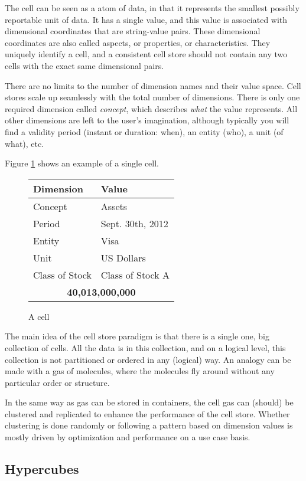 \documentclass{vldb}
\begin{document}
The cell can be seen as a atom of data, in that it represents the smallest possibly reportable unit of data. It has a single value, and this value is associated with dimensional coordinates that are string-value pairs. These dimensional coordinates are also called aspects, or properties, or characteristics. They uniquely identify a cell, and a consistent cell store should not contain any two cells with the exact same dimensional pairs.

There are no limits to the number of dimension names and their value space. Cell stores scale up seamlessly with the total number of dimensions. There is only one required dimension called \emph{concept}, which describes \emph{what} the value represents. All other dimensions are left to the user's imagination, although typically you will find a validity period (instant or duration: when), an entity (who), a unit (of what), etc.

Figure \ref{fig-cell} shows an example of a single cell.

\begin{figure}
\caption{A cell}
\label{fig-cell}
\begin{tabular}{|l|l|}
\hline
Dimension & Value \\
\hline
Concept & Assets \\
Period & Sept. 30th, 2012 \\
Entity & Visa \\
Unit & US Dollars \\
Class of Stock & Class of Stock A \\
\hline
\multicolumn{2}{|c|}{\textbf{40,013,000,000}} \\
\hline
\end{tabular}
\end{figure}

The main idea of the cell store paradigm is that there is a single one, big collection of cells. All the data is in this collection, and on a logical level, this collection is not partitioned or ordered in any (logical) way. An analogy can be made with a gas of molecules, where the molecules fly around without any particular order or structure.

In the same way as gas can be stored in containers, the cell gas can (should) be clustered and replicated to enhance the performance of the cell store. Whether clustering is done randomly or following a pattern based on dimension values is mostly driven by optimization and performance on a use case basis.

\subsection{Hypercubes}
\end{document}
